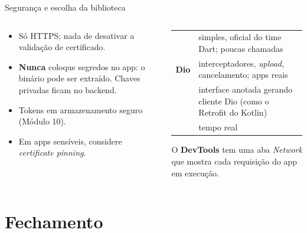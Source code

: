 \documentclass[aspectratio=169,10pt]{beamer}
\begin{document}
\begin{frame}{Segurança e escolha da biblioteca}
  \begin{columns}[T]
    \begin{column}{0.48\textwidth}
      \begin{atencao}
        \begin{itemize}
          \item Só HTTPS; nada de desativar a validação de certificado.
          \item \textbf{Nunca} coloque segredos no app: o binário pode ser extraído. Chaves privadas ficam no backend.
          \item Tokens em armazenamento seguro (Módulo 10).
          \item Em apps sensíveis, considere \emph{certificate pinning}.
        \end{itemize}
      \end{atencao}
    \end{column}
    \begin{column}{0.5\textwidth}
      \scriptsize
      \begin{tabularx}{\linewidth}{@{}l L@{}}
        \toprule
         &  \\
        \midrule
         & simples, oficial do time Dart; poucas chamadas \\
        \textbf{Dio} & interceptadores, \emph{upload}, cancelamento; apps reais \\
         & interface anotada gerando cliente Dio (como o Retrofit do Kotlin) \\
         & tempo real \\
        \bottomrule
      \end{tabularx}
      \begin{dica}
        O \textbf{DevTools} tem uma aba \emph{Network} que mostra cada requisição do app em execução.
      \end{dica}
    \end{column}
  \end{columns}
\end{frame}

\section{Fechamento}
\end{document}
